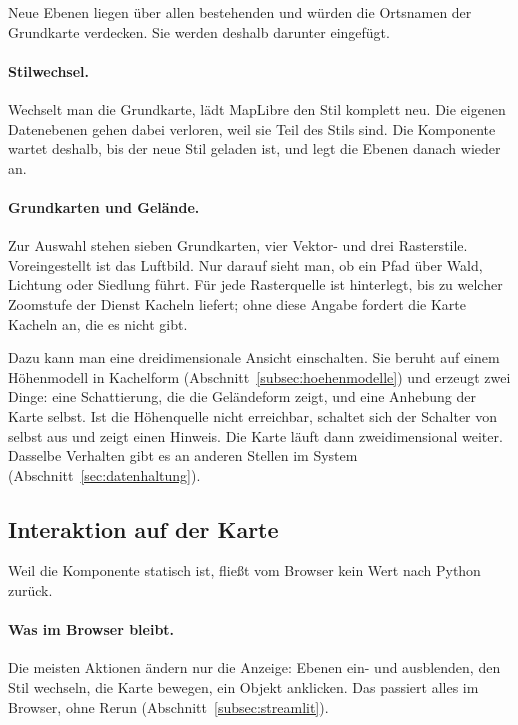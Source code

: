 \documentclass[12pt,a4paper]{report}
\begin{document}
Neue Ebenen liegen über allen bestehenden und würden die Ortsnamen der Grundkarte verdecken.
Sie werden deshalb darunter eingefügt.

\paragraph{Stilwechsel.} Wechselt man die Grundkarte, lädt MapLibre den Stil komplett neu.
Die eigenen Datenebenen gehen dabei verloren, weil sie Teil des Stils sind. Die Komponente
wartet deshalb, bis der neue Stil geladen ist, und legt die Ebenen danach wieder an.

\paragraph{Grundkarten und Gelände.} Zur Auswahl stehen sieben Grundkarten, vier Vektor- und
drei Rasterstile. Voreingestellt ist das Luftbild. Nur darauf sieht man, ob ein Pfad über
Wald, Lichtung oder Siedlung führt. Für jede Rasterquelle ist hinterlegt, bis zu welcher
Zoomstufe der Dienst Kacheln liefert; ohne diese Angabe fordert die Karte Kacheln an, die es
nicht gibt.

Dazu kann man eine dreidimensionale Ansicht einschalten. Sie beruht auf einem Höhenmodell in
Kachelform (Abschnitt~\ref{subsec:hoehenmodelle}) und erzeugt zwei Dinge: eine Schattierung,
die die Geländeform zeigt, und eine Anhebung der Karte selbst. Ist die Höhenquelle nicht
erreichbar, schaltet sich der Schalter von selbst aus und zeigt einen Hinweis. Die Karte
läuft dann zweidimensional weiter. Dasselbe Verhalten gibt es an anderen Stellen im System
(Abschnitt~\ref{sec:datenhaltung}).


 

\subsection{Interaktion auf der Karte}
\label{sec:interaktion}

Weil die Komponente statisch ist, fließt vom Browser kein Wert nach Python zurück.

\paragraph{Was im Browser bleibt.} Die meisten Aktionen ändern nur die Anzeige: Ebenen ein-
und ausblenden, den Stil wechseln, die Karte bewegen, ein Objekt anklicken. Das passiert
alles im Browser, ohne Rerun (Abschnitt~\ref{subsec:streamlit}).
\end{document}
